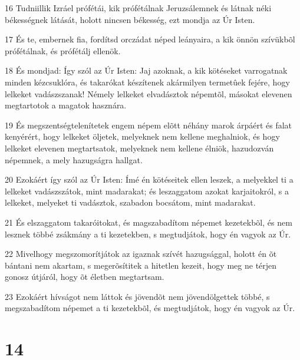 \par 16 Tudniillik Izráel prófétái, kik prófétálnak Jeruzsálemnek és látnak néki békességnek látását, holott nincsen békesség, ezt mondja az Úr Isten.
\par 17 És te, embernek fia, fordítsd orczádat néped leányaira, a kik önnön szívükbõl prófétálnak, és prófétálj ellenök.
\par 18 És mondjad: Így szól az Úr Isten: Jaj azoknak, a kik kötéseket varrogatnak minden kézcsuklóra, és takarókat készítenek akármilyen termetûek fejére, hogy lelkeket vadászszanak! Némely lelkeket elvadásztok népemtõl, másokat elevenen megtartotok a magatok hasznára.
\par 19 És megszentségtelenítetek engem népem elõtt néhány marok árpáért és falat kenyérért, hogy lelkeket öljetek, melyeknek nem kellene meghalniok, és hogy lelkeket elevenen megtartsatok, melyeknek nem kellene élniök, hazudozván népemnek, a mely hazugságra hallgat.
\par 20 Ezokáért így szól az Úr Isten: Ímé én kötéseitek ellen leszek, a melyekkel ti a lelkeket vadászszátok, mint madarakat; és leszaggatom azokat karjaitokról, s a lelkeket, melyeket ti vadásztok, szabadon bocsátom, mint madarakat.
\par 21 És elszaggatom takaróitokat, és magszabadítom népemet kezetekbõl, és nem lesznek többé zsákmány a ti kezetekben, s megtudjátok, hogy én vagyok az Úr.
\par 22 Mivelhogy megszomorítjátok az igaznak szívét hazugsággal, holott én õt bántani nem akartam, s megerõsítitek a hitetlen kezeit, hogy meg ne térjen gonosz útjáról, hogy õt életben megtartsam.
\par 23 Ezokáért hívságot nem láttok és jövendõt nem jövendölgettek többé, s megszabadítom népemet a ti kezetekbõl, és megtudjátok, hogy én vagyok az Úr.

\chapter{14}

